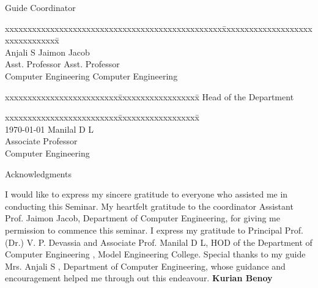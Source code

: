 \documentclass[12pt]{report}
\begin{document}
\begin{titlepage}
\begin{tabbing}
Guide \> Coordinator
\end{tabbing}
\begin{tabbing}
xxxxxxxxxxxxxxxxxxxxxxxxxxxxxxxxxxxxxxxxxxxxxxxx\= xxxxxxxxxxxxxxxxxxxxxxxxxxxxxxxx\= \kill
\vspace{.1in}\\	
Anjali S  \>Jaimon Jacob\\
Asst. Professor	\>Asst. Professor\\
Computer Engineering	\>	Computer Engineering
\end{tabbing}
\vspace{.08in}
%
\begin{tabbing}
xxxxxxxxxxxxxxxxxxxxxxxxx\= xxxxxxxxxxxxxxxxxx\= \kill
\>Head of the Department 
\end{tabbing}
\begin{tabbing}
xxxxxxxxxxxxxxxxxxxxxxxxx\= xxxxxxxxxxxxxxxxxx\= \kill
\vspace{.1in}\\	
\today
\>Manilal D L\\ 
\>Associate Professor\\
\>Computer Engineering\\
\end{tabbing}
\end{titlepage}



\begin{titlepage}

\vspace{.25in}	
\begin{center}
\Large{Acknowledgments}\\
\end{center}
\normalsize
\vspace{.25in}
 I would like to express my sincere gratitude to everyone who assisted me in conducting this Seminar. My heartfelt gratitude to the coordinator Assistant Prof. Jaimon Jacob, Department of Computer Engineering, for giving me permission to commence this seminar. I express my gratitude to Principal Prof. (Dr.) V. P. Devassia and Associate Prof. Manilal D L, HOD of the Department of Computer Engineering , Model Engineering College. Special thanks to my guide Mrs. Anjali  S , Department of Computer Engineering, whose guidance and encouragement helped me through out this endeavour. 
\vspace{.25in}
\flushleft\textbf{Kurian Benoy}


\end{titlepage}
\end{document}

